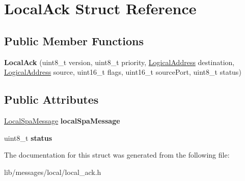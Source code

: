 \hypertarget{structLocalAck}{}\section{Local\+Ack Struct Reference}
\label{structLocalAck}
\subsection*{Public Member Functions}
\begin{DoxyCompactItemize}
\item 
\mbox{\label{structLocalAck_a5f39e6414e3fcf30259766ae0b93b108}} 
{\bfseries Local\+Ack} (uint8\+\_\+t version, uint8\+\_\+t priority, \hyperlink{structLogicalAddress}{Logical\+Address} destination, \hyperlink{structLogicalAddress}{Logical\+Address} source, uint16\+\_\+t flags, uint16\+\_\+t source\+Port, uint8\+\_\+t status)
\end{DoxyCompactItemize}
\subsection*{Public Attributes}
\begin{DoxyCompactItemize}
\item 
\mbox{\label{structLocalAck_aec0984fd1a1277eb62f8cb843993afb0}} 
\hyperlink{structLocalSpaMessage}{Local\+Spa\+Message} {\bfseries local\+Spa\+Message}
\item 
\mbox{\label{structLocalAck_afab082585d3d05a6abd22f4498a8edca}} 
uint8\+\_\+t {\bfseries status}
\end{DoxyCompactItemize}


The documentation for this struct was generated from the following file\+:\begin{DoxyCompactItemize}
\item 
lib/messages/local/local\+\_\+ack.\+h\end{DoxyCompactItemize}
